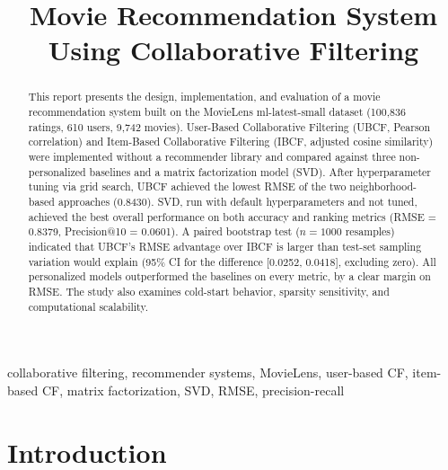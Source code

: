 \documentclass[conference]{IEEEtran}
\begin{document}
\title{Movie Recommendation System Using Collaborative Filtering}

\author{
}

\maketitle

\begin{abstract}
This report presents the design, implementation, and evaluation of a movie recommendation system built on the MovieLens ml-latest-small dataset (100,836 ratings, 610 users, 9,742 movies). User-Based Collaborative Filtering (UBCF, Pearson correlation) and Item-Based Collaborative Filtering (IBCF, adjusted cosine similarity) were implemented without a recommender library and compared against three non-personalized baselines and a matrix factorization model (SVD). After hyperparameter tuning via grid search, UBCF achieved the lowest RMSE of the two neighborhood-based approaches (0.8430). SVD, run with default hyperparameters and not tuned, achieved the best overall performance on both accuracy and ranking metrics (RMSE = 0.8379, Precision@10 = 0.0601). A paired bootstrap test ($n=1000$ resamples) indicated that UBCF's RMSE advantage over IBCF is larger than test-set sampling variation would explain (95\% CI for the difference [0.0252, 0.0418], excluding zero). All personalized models outperformed the baselines on every metric, by a clear margin on RMSE. The study also examines cold-start behavior, sparsity sensitivity, and computational scalability.
\end{abstract}

\begin{IEEEkeywords}
collaborative filtering, recommender systems, MovieLens, user-based CF, item-based CF, matrix factorization, SVD, RMSE, precision-recall
\end{IEEEkeywords}

\section{Introduction}
\end{document}

